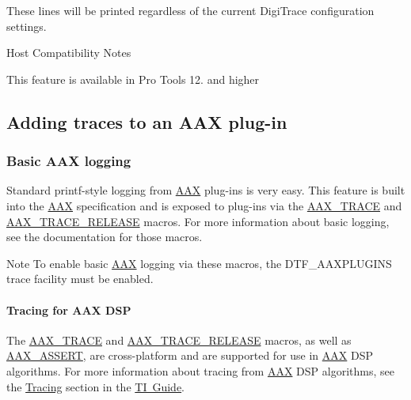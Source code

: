  These lines will be printed regardless of the current Digi\+Trace configuration settings.

 \begin{DoxyRefDesc}{Host Compatibility Notes}
\item[\mbox{\hyperlink{a00786__compatibility_notes000007}{Host Compatibility Notes}}]This feature is available in Pro Tools 12. and higher\end{DoxyRefDesc}




 \hypertarget{a00834_digitrace__tracingfromplugins}{}\subsection{Adding traces to an A\+A\+X plug-\/in}\label{a00834_digitrace__tracingfromplugins}
 \hypertarget{a00834_digitrace__tracingfromplugins__basiclogging}{}\subsubsection{Basic A\+A\+X logging}\label{a00834_digitrace__tracingfromplugins__basiclogging}
 Standard {\ttfamily printf}-\/style logging from \mbox{\hyperlink{a00852}{A\+AX}} plug-\/ins is very easy. This feature is built into the \mbox{\hyperlink{a00852}{A\+AX}} specification and is exposed to plug-\/ins via the \mbox{\hyperlink{a00395_ab53f1d6a94f8b6ebb3a101f71bfe4e82}{A\+A\+X\+\_\+\+T\+R\+A\+CE}} and \mbox{\hyperlink{a00395_ac2aa820ece56bb59140ad561218db4b3}{A\+A\+X\+\_\+\+T\+R\+A\+C\+E\+\_\+\+R\+E\+L\+E\+A\+SE}} macros. For more information about basic logging, see the documentation for those macros.

 \begin{DoxyNote}{Note}
To enable basic \mbox{\hyperlink{a00852}{A\+AX}} logging via these macros, the {\ttfamily D\+T\+F\+\_\+\+A\+A\+X\+P\+L\+U\+G\+I\+NS} trace facility must be enabled.
\end{DoxyNote}
\hypertarget{a00834_digitrace__tracingfromplugins__basiclogging__dsp}{}\paragraph{Tracing for A\+A\+X D\+SP}\label{a00834_digitrace__tracingfromplugins__basiclogging__dsp}
 The \mbox{\hyperlink{a00395_ab53f1d6a94f8b6ebb3a101f71bfe4e82}{A\+A\+X\+\_\+\+T\+R\+A\+CE}} and \mbox{\hyperlink{a00395_ac2aa820ece56bb59140ad561218db4b3}{A\+A\+X\+\_\+\+T\+R\+A\+C\+E\+\_\+\+R\+E\+L\+E\+A\+SE}} macros, as well as \mbox{\hyperlink{a00395_a168ee44fd7a5485ab50160db36fb2988}{A\+A\+X\+\_\+\+A\+S\+S\+E\+RT}}, are cross-\/platform and are supported for use in \mbox{\hyperlink{a00852}{A\+AX}} D\+SP algorithms. For more information about tracing from \mbox{\hyperlink{a00852}{A\+AX}} D\+SP algorithms, see the \mbox{\hyperlink{a00832_subsection__tracing}{Tracing}} section in the \mbox{\hyperlink{a00832}{TI Guide}}.

